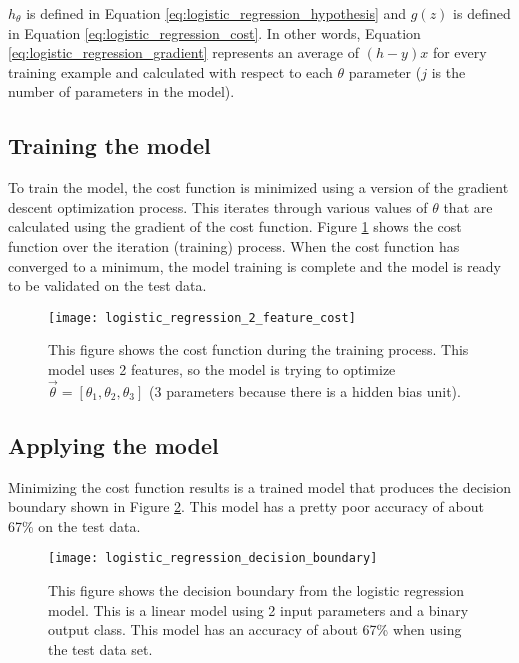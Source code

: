 $h_{\theta}$ is defined in Equation \ref{eq:logistic_regression_hypothesis} and $g(z)$ is defined in Equation \ref{eq:logistic_regression_cost}.  In other words, Equation \ref{eq:logistic_regression_gradient} represents an average of $(h-y)x$ for every training example and calculated with respect to each $\theta$ parameter ($j$ is the number of parameters in the model).

\subsection{Training the model}
To train the model, the cost function is minimized using a version of the gradient descent optimization process.  This iterates through various values of $\theta$ that are calculated using the gradient of the cost function.  Figure \ref{fig:logistic_regression_2_feature_cost} shows the cost function over the iteration (training) process.  When the cost function has converged to a minimum, the model training is complete and the model is ready to be validated on the test data.

\begin{figure}
	\centering
	\texttt{[image: logistic\_regression\_2\_feature\_cost]}
	\decoRule
	\caption{This figure shows the cost function during the training process.  This model uses 2 features, so the model is trying to optimize $\vec{\theta} = [\theta_1, \theta_2, \theta_3]$ (3 parameters because there is a hidden bias unit).}
	\label{fig:logistic_regression_2_feature_cost}
\end{figure}

\subsection{Applying the model}
Minimizing the cost function results is a trained model that produces the decision boundary shown in Figure \ref{fig:logistic_regression_decision_boundary}.  This model has a pretty poor accuracy of about 67\% on the test data.

\begin{figure}
	\centering
	\texttt{[image: logistic\_regression\_decision\_boundary]}
	\decoRule
	\caption{This figure shows the decision boundary from the logistic regression model.  This is a linear model using 2 input parameters and a binary output class.  This model has an accuracy of about 67\% when using the test data set.}
	\label{fig:logistic_regression_decision_boundary}
\end{figure}

